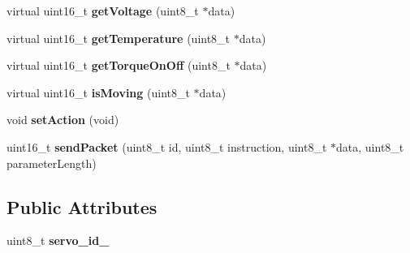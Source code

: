 \begin{DoxyCompactItemize}
\item 
virtual uint16\+\_\+t {\bfseries get\+Voltage} (uint8\+\_\+t $\ast$data)\hypertarget{classCytron__G15__Servo_ad11a3003e8db88b81d63baf23c7a7cf3}{}\label{classCytron__G15__Servo_ad11a3003e8db88b81d63baf23c7a7cf3}

\item 
virtual uint16\+\_\+t {\bfseries get\+Temperature} (uint8\+\_\+t $\ast$data)\hypertarget{classCytron__G15__Servo_aca2afd822031d37ffb9f5973370517f6}{}\label{classCytron__G15__Servo_aca2afd822031d37ffb9f5973370517f6}

\item 
virtual uint16\+\_\+t {\bfseries get\+Torque\+On\+Off} (uint8\+\_\+t $\ast$data)\hypertarget{classCytron__G15__Servo_a8d219ed8406313c53a00bddf81b90677}{}\label{classCytron__G15__Servo_a8d219ed8406313c53a00bddf81b90677}

\item 
virtual uint16\+\_\+t {\bfseries is\+Moving} (uint8\+\_\+t $\ast$data)\hypertarget{classCytron__G15__Servo_a3854ba546f35b228dc99c7c9d60bb000}{}\label{classCytron__G15__Servo_a3854ba546f35b228dc99c7c9d60bb000}

\item 
void {\bfseries set\+Action} (void)\hypertarget{classCytron__G15__Servo_a1552f7f170eb517fa76079557d9a29d5}{}\label{classCytron__G15__Servo_a1552f7f170eb517fa76079557d9a29d5}

\item 
uint16\+\_\+t {\bfseries send\+Packet} (uint8\+\_\+t id, uint8\+\_\+t instruction, uint8\+\_\+t $\ast$data, uint8\+\_\+t parameter\+Length)\hypertarget{classCytron__G15__Servo_aaab32bae80c27bc72522eb6b029a6b84}{}\label{classCytron__G15__Servo_aaab32bae80c27bc72522eb6b029a6b84}

\end{DoxyCompactItemize}
\subsection*{Public Attributes}
\begin{DoxyCompactItemize}
\item 
uint8\+\_\+t {\bfseries servo\+\_\+id\+\_\+}\hypertarget{classCytron__G15__Servo_a82c996820f49b5298d15f0628e8f2a93}{}\label{classCytron__G15__Servo_a82c996820f49b5298d15f0628e8f2a93}

\end{DoxyCompactItemize}
